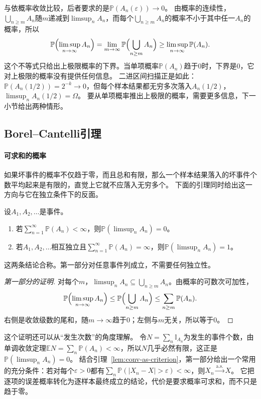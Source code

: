 与依概率收敛比较，后者要求的是$\mathbb P(A_n(\varepsilon))\to0$。
由概率的连续性，$\bigcup_{n\geq m}A_n$随$m$递减到$\limsup_nA_n$，而每个$\bigcup_{n\geq m}A_n$的概率不小于其中任一$A_n$的概率，所以
\[
  \mathbb P\Bigl(\limsup_{n\to\infty}A_n\Bigr)=\lim_{m\to\infty}\mathbb P\Bigl(\bigcup_{n\geq m}A_n\Bigr)\geq\limsup_{n\to\infty}\mathbb P(A_n).
\]
这个不等式只给出上极限概率的下界。当单项概率$\mathbb P(A_n)$趋于$0$时，下界是$0$，它对上极限的概率没有提供任何信息。
二进区间扫描正是如此：$\mathbb P(A_n(1/2))=2^{-k}\to0$，但每个样本结果都无穷多次落入$A_n(1/2)$，$\limsup_nA_n(1/2)=\Omega$。
要从单项概率推出上极限的概率，需要更多信息，下一小节给出两种情形。

\subsection{Borel--Cantelli引理}

\paragraph{可求和的概率}
如果坏事件的概率不仅趋于零，而且总和有限，那么一个样本结果落入的坏事件个数平均起来是有限的，直觉上它就不应落入无穷多个。
下面的引理同时给出这一方向与它在独立条件下的反面。

\begin{lemma}
\label{lem:conv-borel-cantelli}
设$A_1,A_2,\ldots$是事件。
\begin{enumerate}
  \item 若$\sum_{n=1}^{\infty}\mathbb P(A_n)<\infty$，则$\mathbb P(\limsup_nA_n)=0$。
  \item 若$A_1,A_2,\ldots$相互独立且$\sum_{n=1}^{\infty}\mathbb P(A_n)=\infty$，则$\mathbb P(\limsup_nA_n)=1$。
\end{enumerate}
\end{lemma}

这两条结论合称。第一部分对任意事件列成立，不需要任何独立性。

\begin{proof}[第一部分的证明]
对每个$m$，$\limsup_nA_n\subseteq\bigcup_{n\geq m}A_n$。由概率的可数次可加性，
\[
  \mathbb P\Bigl(\limsup_{n\to\infty}A_n\Bigr)\leq\mathbb P\Bigl(\bigcup_{n\geq m}A_n\Bigr)\leq\sum_{n\geq m}\mathbb P(A_n).
\]
右侧是收敛级数的尾和，随$m\to\infty$趋于$0$；左侧与$m$无关，所以等于$0$。
\end{proof}

这个证明还可以从“发生次数”的角度理解。
令$N=\sum_n\mathbb I_{A_n}$为发生的事件个数，由单调收敛定理$\mathbb EN=\sum_n\mathbb P(A_n)<\infty$，所以$N$几乎必然有限，这正是$\mathbb P(\limsup_nA_n)=0$。
结合引理~\ref{lem:conv-as-criterion}，第一部分给出一个常用的充分条件：若对每个$\varepsilon>0$都有$\sum_n\mathbb P(|X_n-X|>\varepsilon)<\infty$，则$X_n\xrightarrow{\mathrm{a.s.}}X$。
它把逐项的误差概率转化为逐样本最终成立的结论，代价是要求概率可求和，而不只是趋于零。

